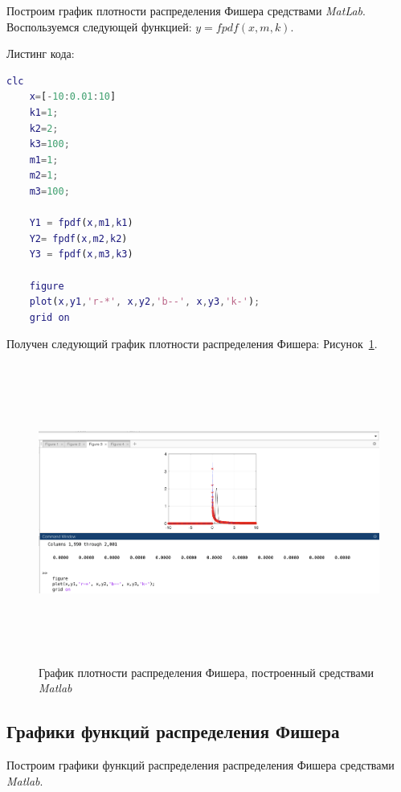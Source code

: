 \documentclass[a4paper,hidelinks,14pt]{extarticle}
\begin{document}
Построим график плотности распределения Фишера средствами \textit{MatLab}. Воспользуемся следующей функцией: $y=fpdf(x,m,k)$.

Листинг кода: \\
\begin{minipage}{\linewidth}
\begin{lstlisting}[language=matlab,caption=Код программы \textit{Matlab}, label={lst:listing2}]
    clc
    x=[-10:0.01:10]
    k1=1;
    k2=2;
    k3=100;
    m1=1;
    m2=1;
    m3=100;

    Y1 = fpdf(x,m1,k1)
    Y2= fpdf(x,m2,k2)
    Y3 = fpdf(x,m3,k3)

    figure
    plot(x,y1,'r-*', x,y2,'b--', x,y3,'k-');
    grid on
\end{lstlisting}
\end{minipage}

Получен следующий график плотности распределения Фишера: Рисунок~\ref{fig:fig4}.

\begin{figure}[!htbp]
    \centering
    \includegraphics[width=150mm,height=98mm]{fig/raspr3.png}
    \caption{График плотности распределения Фишера, построенный средствами \textit{Matlab}}
    \label{fig:fig4}
\end{figure}


\subsection{Графики функций распределения Фишера}

Построим графики функций распределения распределения Фишера средствами \textit{Matlab}.
\end{document}
